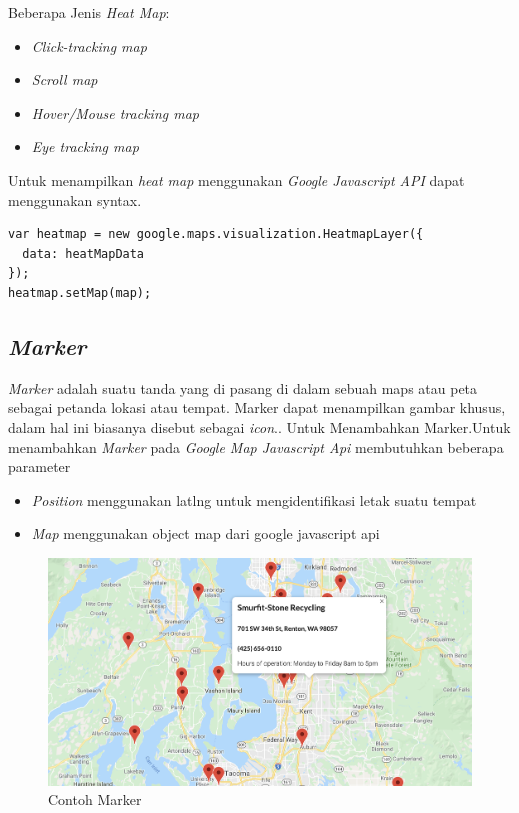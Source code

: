 Beberapa Jenis \textit{Heat Map}:
 \begin{itemize}
     \item \textit{Click-tracking map}
     \item \textit{Scroll map}
     \item \textit{Hover/Mouse tracking map}
     \item \textit{Eye tracking map}
 \end{itemize}
 
 Untuk menampilkan \textit{heat map } menggunakan \textit{Google Javascript API} dapat menggunakan syntax.
 \begin{lstlisting}
var heatmap = new google.maps.visualization.HeatmapLayer({
  data: heatMapData
});
heatmap.setMap(map);

\end{lstlisting}
 
 \subsection{\textit{Marker}}
 \label{subsec:heat map}
 \textit{Marker } adalah suatu tanda yang di pasang di dalam sebuah maps atau peta sebagai petanda lokasi atau tempat. Marker  dapat menampilkan gambar khusus, dalam hal ini biasanya disebut sebagai \textit{icon}.\cite{GoogleMarker:01:Maps}.
 Untuk Menambahkan Marker.Untuk menambahkan \textit{Marker} pada \textit{Google Map Javascript Api} membutuhkan beberapa parameter
  \begin{itemize}
     \item \textit{Position}  menggunakan latlng untuk mengidentifikasi letak suatu tempat
     \item \textit{Map} menggunakan object map dari google javascript api
 \end{itemize}
 \begin{figure}[H]
    \centering
    \includegraphics[scale=0.2]{Gambar/marker_example.png}
    \caption{Contoh Marker}
    \label{fig:my_label}
\end{figure}

